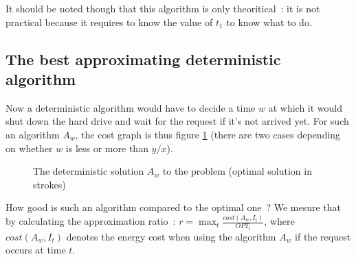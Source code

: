\documentclass[a4paper,11pt]{article}
\begin{document}
It should be noted though that this algorithm is only theoritical~: it is not practical because it requires to know the value of $t_1$ to know what to do.

\subsection{The best approximating deterministic algorithm}

Now a deterministic algorithm would have to decide a time $w$ at which it would shut down the hard drive and wait for the request if it's not arrived yet. For such an algorithm $A_w$, the cost graph is thus figure \ref{fig2} (there are two cases depending on whether $w$ is less or more than $y/x$).

\begin{figure}
	\centering
		\hspace{1cm}
	\caption{The deterministic solution $A_w$ to the problem (optimal solution in strokes)} \label{fig2}
\end{figure}

\medskip

How good is such an algorithm compared to the optimal one~? We mesure that by calculating the approximation ratio~: $r = \max_t{\frac{cost(A_w, I_t)}{OPT_t}}$, where $cost(A_w, I_t)$ denotes the energy cost when using the algorithm $A_w$ if the request occurs at time $t$.
\end{document}
